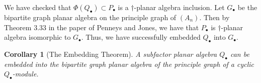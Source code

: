 \documentclass[11pt]{article}
\theoremstyle{plain}
\newtheorem{cor}[thm]{Corollary}
\theoremstyle{definition}
\begin{document}
We have checked that $\Phi(Q_{\bullet}) \subset P_{\bullet}$ is a $\dagger$-planar algebra inclusion. Let $G_\bullet$ be the bipartite graph planar algebra on the principle graph of $(A_n)$. Then by Theorem 3.33 in the paper of Penneys and Jones, %
we have that $P_\bullet$ is $\dagger$-planar algebra isomorphic to $G_\bullet$. Thus, we have successfully embedded $Q_\bullet$ into $G_\bullet$.

\begin{cor}[The Embedding Theorem]
	A subfactor planar algebra $Q_\bullet$ can be embedded into the bipartite graph planar algebra of the principle graph of a cyclic $Q_\bullet$-module.
\end{cor}
\end{document}
